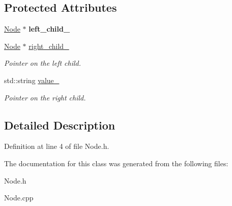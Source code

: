 \subsection*{Protected Attributes}
\begin{DoxyCompactItemize}
\item 
\mbox{\label{classNode_a5ee0db484771d8654c32e7863fba292e}} 
\hyperlink{classNode}{Node} $\ast$ {\bfseries left\+\_\+child\+\_\+}
\item 
\mbox{\label{classNode_abf180145dff7ffce95b3b39bfe24d2f6}} 
\hyperlink{classNode}{Node} $\ast$ \hyperlink{classNode_abf180145dff7ffce95b3b39bfe24d2f6}{right\+\_\+child\+\_\+}
\begin{DoxyCompactList}\small\item\em Pointer on the left child. \end{DoxyCompactList}\item 
\mbox{\label{classNode_ae44ac8cca17985520d95040e0e8bb167}} 
std\+::string \hyperlink{classNode_ae44ac8cca17985520d95040e0e8bb167}{value\+\_\+}
\begin{DoxyCompactList}\small\item\em Pointer on the right child. \end{DoxyCompactList}\end{DoxyCompactItemize}


\subsection{Detailed Description}


Definition at line 4 of file Node.\+h.



The documentation for this class was generated from the following files\+:\begin{DoxyCompactItemize}
\item 
Node.\+h\item 
Node.\+cpp\end{DoxyCompactItemize}
